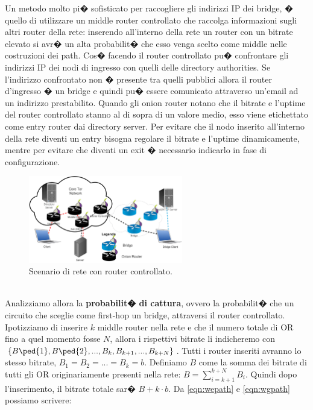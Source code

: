 Un metodo molto pi� sofisticato \cite{torbridge} per raccogliere gli indirizzi IP dei bridge, � quello di utilizzare un middle router controllato che raccolga informazioni sugli altri router della rete: inserendo all'interno della rete un router con un bitrate elevato si avr� un alta probabilit� che esso venga scelto come middle nelle costruzioni dei path. Cos� facendo il router controllato pu� confrontare gli indirizzi IP dei nodi di ingresso con quelli delle directory authorities. Se l'indirizzo confrontato non � presente tra quelli pubblici allora il router d'ingresso � un bridge e quindi pu� essere comunicato attraverso un'email ad un indirizzo prestabilito. Quando gli onion router notano che il bitrate e l'uptime del router controllato stanno al di sopra di un valore medio, esso viene etichettato come entry router dai directory server. Per evitare che il nodo inserito all'interno della rete diventi un entry bisogna regolare il bitrate e l'uptime dinamicamente, mentre per evitare che diventi un exit � necessario indicarlo in fase di configurazione.
\begin{figure}[!htbp]
\centering
\includegraphics[width=0.6\textwidth]{./figure//middleroutercut2}
\caption{Scenario di rete con router controllato.}
\label{FIG:TorBridge}
\end{figure}
\\Analizziamo allora la \textbf{probabilit� di cattura}, ovvero la probabilit� che un circuito che sceglie come first-hop un bridge, attraversi il router controllato. Ipotizziamo di inserire $k$ middle router nella rete e che il numero totale di OR fino a quel momento fosse $N$, allora i rispettivi bitrate li indicheremo con $\{B\ped{1},B\ped{2}, ... , B_{k}, B_{k+1}, ... , B_{k+N}\}$. Tutti i router inseriti avranno lo stesso bitrate, $B_1 = B_2 = ... = B_k = b$. Definiamo $B$ come la somma dei bitrate di tutti gli OR originariamente presenti nella rete: $B = \sum_{i=k+1}^{k+N} B_i$. Quindi dopo l'inserimento, il bitrate totale sar� $B+k \cdot b$. Da \eqref{eqn:wepath} e \eqref{eqn:wgpath} possiamo scrivere:

